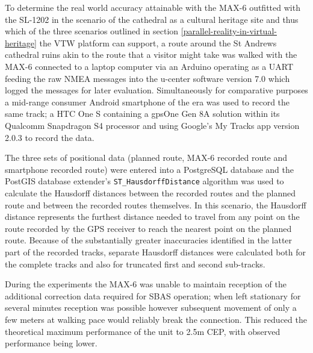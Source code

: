 To determine the real world accuracy attainable with the MAX-6 outfitted with the SL-1202 in the scenario of the cathedral as a cultural heritage site and thus which of the three scenarios outlined in section \ref{parallel-reality-in-virtual-heritage} the VTW platform can support, a route around the St Andrews cathedral ruins akin to the route that a visitor might take was walked with the MAX-6 connected to a laptop computer via an Arduino operating as a UART feeding the raw NMEA messages into the u-center software version 7.0 which logged the messages for later evaluation. Simultaneously for comparative purposes a mid-range consumer Android smartphone of the era was used to record the same track; a HTC One S\htconesFootnote{} containing a gpsOne Gen 8A solution within its Qualcomm Snapdragon S4 processor\snapdragonFootnote{} and using Google's My Tracks\mytracksFootnote{} app version 2.0.3 to record the data.

The three sets of positional data (planned route, MAX-6 recorded route and smartphone recorded route) were entered into a PostgreSQL database and the PostGIS database extender's \texttt{ST\_HausdorffDistance} algorithm\hausdorffFootnote{} was used to calculate the Hausdorff distances between the recorded routes and the planned route and between the recorded routes themselves. In this scenario, the Hausdorff distance represents the furthest distance needed to travel from any point on the route recorded by the GPS receiver to reach the nearest point on the planned route. Because of the substantially greater inaccuracies identified in the latter part of the recorded tracks, separate Hausdorff distances were calculated both for the complete tracks and also for truncated first and second sub-tracks.


During the experiments the MAX-6 was unable to maintain reception of the additional correction data required for SBAS operation; when left stationary for several minutes reception was possible however subsequent movement of only a few meters at walking pace would reliably break the connection. This reduced the theoretical maximum performance of the unit to 2.5m CEP, with observed performance being lower.

